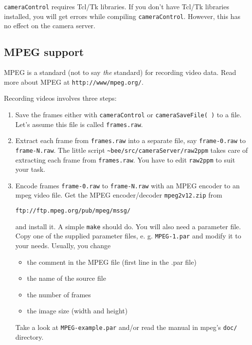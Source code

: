 \documentclass{article}
\begin{document}
\texttt{cameraControl} requires Tcl/Tk libraries. If you don't have Tcl/Tk
libraries installed, you will get errors while compiling
\texttt{cameraControl}.  However, this has no effect on the camera server.
 
\subsection{MPEG support}
 
MPEG is a standard (not to say \emph{the} standard) for recording video data. Read
more about MPEG at \texttt{http://www/mpeg.org/}.
 
Recording videos involves three steps: 

\begin{enumerate}
  
\item Save the frames either with \texttt{cameraControl} or
  \texttt{cameraSaveFile( )} to a file. Let's assume this file is called
  \texttt{frames.raw}.
  
\item Extract each frame from \texttt{frames.raw} into a separate file, say
  \texttt{frame-0.raw} to \texttt{frame-N.raw}. The little script
  \texttt{\~{}bee/src/cameraServer/raw2ppm} takes care of extracting each
  frame from \texttt{frames.raw}. You have to edit \texttt{raw2ppm} to suit
  your task.
  
\item Encode frames \texttt{frame-0.raw} to \texttt{frame-N.raw} with an MPEG
  encoder to an mpeg video file. Get the MPEG encoder/decoder
  \texttt{mpeg2v12.zip} from 
  \begin{center}
    \texttt{ftp://ftp.mpeg.org/pub/mpeg/mssg/}
  \end{center}
  and install it. A simple \texttt{make} should do.  You will also need a
  parameter file. Copy one of the supplied parameter files, e. g.
  \texttt{MPEG-1.par} and modify it to your needs. Usually, you change

  \begin{itemize}
  \item the comment in the MPEG file (first line in the .par file)
  \item the name of the source file
  \item the number of frames
  \item the image size (width and height)
  \end{itemize}
  
  Take a look at \texttt{MPEG-example.par} and/or read the manual in mpeg's
  \texttt{doc/} directory.

\end{enumerate}
 
\end{document}
